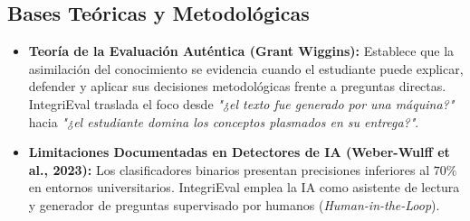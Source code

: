 \documentclass[11pt,a4paper]{article}
\begin{document}
\subsection{Bases Teóricas y Metodológicas}
\begin{itemize}[leftmargin=*]
    \item \textbf{Teoría de la Evaluación Auténtica (Grant Wiggins):} Establece que la asimilación del conocimiento se evidencia cuando el estudiante puede explicar, defender y aplicar sus decisiones metodológicas frente a preguntas directas. IntegriEval traslada el foco desde \textit{"¿el texto fue generado por una máquina?"} hacia \textit{"¿el estudiante domina los conceptos plasmados en su entrega?"}.
    \item \textbf{Limitaciones Documentadas en Detectores de IA (Weber-Wulff et al., 2023):} Los clasificadores binarios presentan precisiones inferiores al $70\%$ en entornos universitarios. IntegriEval emplea la IA como asistente de lectura y generador de preguntas supervisado por humanos (\textit{Human-in-the-Loop}).
\end{itemize}
\end{document}
